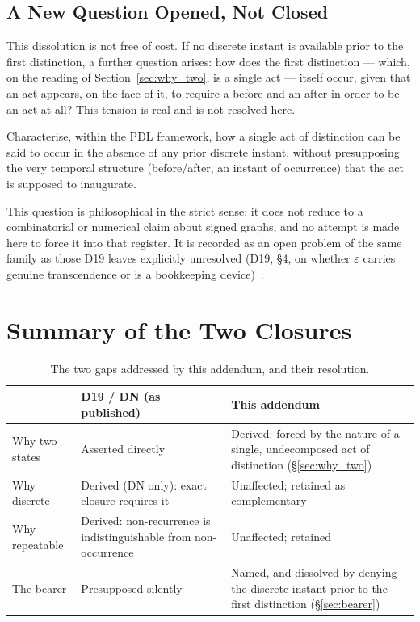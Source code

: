 \documentclass[11pt,a4paper]{article}
\begin{document}
\subsection{A New Question Opened, Not Closed}

This dissolution is not free of cost. If no discrete instant is available prior to the first distinction, a further question arises: how does the first distinction --- which, on the reading of Section~\ref{sec:why_two}, is a single act --- itself occur, given that an act appears, on the face of it, to require a before and an after in order to be an act at all? This tension is real and is not resolved here.

\begin{openprobbox}
\label{op:act_without_instant}
Characterise, within the PDL framework, how a single act of distinction can be said to occur in the absence of any prior discrete instant, without presupposing the very temporal structure (before/after, an instant of occurrence) that the act is supposed to inaugurate.
\end{openprobbox}

This question is philosophical in the strict sense: it does not reduce to a combinatorial or numerical claim about signed graphs, and no attempt is made here to force it into that register. It is recorded as an open problem of the same family as those D19 leaves explicitly unresolved (D19, \S 4, on whether $\varepsilon$ carries genuine transcendence or is a bookkeeping device)~\citep{D19}.

\section{Summary of the Two Closures}
\label{sec:summary}

\begin{table}[h]
\centering
\caption{The two gaps addressed by this addendum, and their resolution.}
\label{tab:summary}
\begin{tabular}{p{3.6cm}p{5.2cm}p{5.6cm}}
\toprule
& \textbf{D19 / DN (as published)} & \textbf{This addendum} \\
\midrule
Why two states & Asserted directly & Derived: forced by the nature of a single, undecomposed act of distinction (\S\ref{sec:why_two}) \\
Why discrete & Derived (DN only): exact closure requires it & Unaffected; retained as complementary \\
Why repeatable & Derived: non-recurrence is indistinguishable from non-occurrence & Unaffected; retained \\
The bearer & Presupposed silently & Named, and dissolved by denying the discrete instant prior to the first distinction (\S\ref{sec:bearer}) \\
\bottomrule
\end{tabular}
\end{table}
\end{document}
